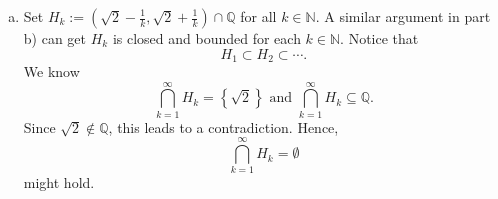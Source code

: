 \begin{Exercise}
\begin{enumerate}[a)]
\begin{proof}
\begin{itemize}
If $(\sqrt{2}, \sqrt{3})\cap \mathbb{Q}$ is compact, then there exists $N\in\mathbb{N}$ such that 
$$
(\sqrt{2}, \sqrt{3})\cap \mathbb{Q} \subseteq \bigcup_{k=1}^{N} B_{r_k}(x_k).
$$
But the open balls are disjoint, so there is a point $x\in(\sqrt{2}, \sqrt{3})\cap \mathbb{Q}$ such that
$$
x\notin\bigcup_{k=1}^{N} B_{r_k}(x_k).
$$
We conclude $(\sqrt{2}, \sqrt{3})\cap \mathbb{Q}$ is not compact.
\end{itemize}
\end{proof}

\item
\begin{solution}
Set $H_k := \left( \sqrt{2}-\frac{1}{k}, \sqrt{2}+\frac{1}{k} \right) \cap \mathbb{Q}$ for all $k\in\mathbb{N}$. A similar argument in part b) can get $H_k$ is closed and bounded for each $k\in\mathbb{N}$. Notice that
$$
H_1 \subset H_2 \subset \cdots.
$$
We know
$$
\bigcap_{k=1}^{\infty} H_k = \left\{\sqrt{2}\right\} \text{ and } \bigcap_{k=1}^{\infty} H_k \subseteq \mathbb{Q}.
$$
Since $\sqrt{2} \notin \mathbb{Q}$, this leads to a contradiction. Hence,
$$
\bigcap_{k=1}^{\infty} H_k = \emptyset
$$
might hold.
\end{solution}
\end{enumerate}
\end{Exercise}